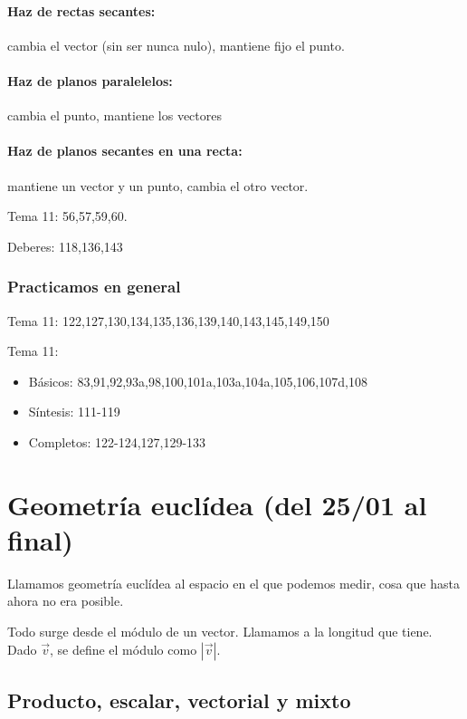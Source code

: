 \paragraph{Haz de rectas secantes: } cambia el vector (sin ser nunca nulo), mantiene fijo el punto.
\paragraph{Haz de planos paralelelos: } cambia el punto, mantiene los vectores
\paragraph{Haz de planos secantes en una recta: } mantiene un vector y un punto, cambia el otro vector.

\begin{problem}
Tema 11: 56,57,59,60.
\solution
\end{problem}

Deberes: 118,136,143

\subsubsection{Practicamos en general}

Tema 11: 
122,127,130,134,135,136,139,140,143,145,149,150

Tema 11:
\begin{itemize}
  \item Básicos: 83,91,92,93a,98,100,101a,103a,104a,105,106,107d,108
  \item Síntesis: 111-119
  \item Completos: 122-124,127,129-133
\end{itemize}




\section{Geometría euclídea (del 25/01 al final)}

Llamamos geometría euclídea al espacio en el que podemos medir, cosa que hasta ahora no era posible.

Todo surge desde el módulo de un vector. Llamamos  a la longitud que tiene. Dado $\vec{v}$, se define el módulo como $|\vec{v}|$.

\subsection{Producto, escalar, vectorial y mixto}

